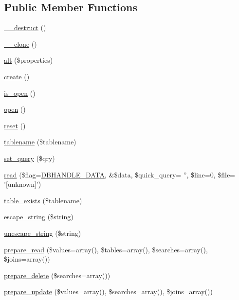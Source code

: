 \subsection*{Public Member Functions}
\begin{DoxyCompactItemize}
\item 
\hyperlink{classDbHandler_a7cd6bd727d1f296eb5dbfae6ca36ab3f}{\_\-\_\-destruct} ()
\item 
\hyperlink{classDbHandler_ada20e62b915bc87a1de28389a2ee81e1}{\_\-\_\-clone} ()
\item 
\hyperlink{classDbHandler_a82105c9c768f26a7a5ec84019121bbeb}{alt} (\$properties)
\item 
\hyperlink{classDbHandler_ac9e93cb0ab57f03b2719eebd0c0ee2ef}{create} ()
\item 
\hyperlink{classDbHandler_aa342b2bd73c5f8ce05cadcba02f9cf5a}{is\_\-open} ()
\item 
\hyperlink{classDbHandler_afccbfc69ead84f8445116e050d1cfc2d}{open} ()
\item 
\hyperlink{classDbHandler_a9982df4830f05803935bb31bac7fae3d}{reset} ()
\item 
\hyperlink{classDbHandler_abaca15a312800e5522b3efd9dff036f5}{tablename} (\$tablename)
\item 
\hyperlink{classDbHandler_a305a3225c4760a88a06b0d55d0893962}{set\_\-query} (\$qry)
\item 
\hyperlink{classDbHandler_a5ebfdc2acfcb0e9cbc2861fc55c7127c}{read} (\$flag=\hyperlink{class_8dbhandler_8php_acc5178c2a582eafa4ef488ed3394b725}{DBHANDLE\_\-DATA}, \&\$data, \$quick\_\-query= '', \$line=0, \$file= '\mbox{[}unknown\mbox{]}')
\item 
\hyperlink{classDbHandler_a11e750a2c46022241eba49df81607ba9}{table\_\-exists} (\$tablename)
\item 
\hyperlink{classDbHandler_a67d77702ff6db70f89123d3f947af143}{escape\_\-string} (\$string)
\item 
\hyperlink{classDbHandler_a27c604b14c39913d34630e5504979b15}{unescape\_\-string} (\$string)
\item 
\hyperlink{classDbHandler_a3f9a0832d2de73e1f698b6d3c33569e6}{prepare\_\-read} (\$values=array(), \$tables=array(), \$searches=array(), \$joins=array())
\item 
\hyperlink{classDbHandler_a973e07b361c889b6ff44e93cc7665ca4}{prepare\_\-delete} (\$searches=array())
\item 
\hyperlink{classDbHandler_a9bddaca38be2544f6fdd4d82b3cd1c50}{prepare\_\-update} (\$values=array(), \$searches=array(), \$joins=array())

\end{DoxyCompactItemize}
